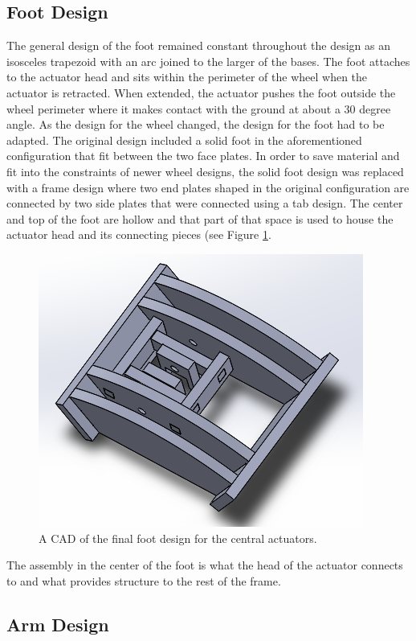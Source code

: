 \documentclass[12pt]{article}
\numberwithin{figure}{section}
\begin{document}
\begin{multicols}{2}
\subsection{Foot Design}
The general design of the foot remained constant throughout the design as an isosceles trapezoid with an arc joined to the larger of the bases. The foot attaches to the actuator head and sits within the perimeter of the wheel when the actuator is retracted. When extended, the actuator pushes the foot outside the wheel perimeter where it makes contact with the ground at about a 30 degree angle. As the design for the wheel changed, the design for the foot had to be adapted. The original design  included a solid foot in the aforementioned configuration that fit between the two face plates. In order to save material and fit into the constraints of newer wheel designs, the solid foot design was replaced with a frame design where two end plates shaped in the original configuration are connected by two side plates that were connected using a tab design. The center and top of the foot are hollow and that part of that space is used to house the actuator head and its connecting pieces (see Figure \ref{fig:final_foot}. 

\begin{figure}[H]
\includegraphics[scale=0.6]{Foot.png}
\caption{A CAD of the final foot design for the central actuators.}
\label{fig:final_foot}
\end{figure}

The assembly in the center of the foot is what the head of the actuator connects to and what provides structure to the rest of the frame.

\subsection{Arm Design}


\end{multicols}
\end{document}
